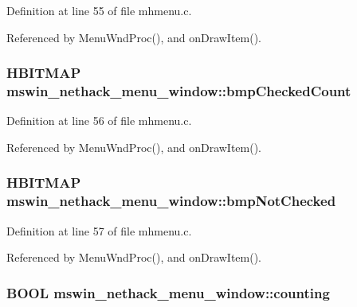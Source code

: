 Definition at line 55 of file mhmenu.\+c.



Referenced by Menu\+Wnd\+Proc(), and on\+Draw\+Item().

\hypertarget{structmswin__nethack__menu__window_a489e74d381e225e45bdcd709b76a9c4a}{
\subsubsection[{bmp\+Checked\+Count}]{\setlength{\rightskip}{0pt plus 5cm}H\+B\+I\+T\+M\+A\+P mswin\+\_\+nethack\+\_\+menu\+\_\+window\+::bmp\+Checked\+Count}}\label{structmswin__nethack__menu__window_a489e74d381e225e45bdcd709b76a9c4a}


Definition at line 56 of file mhmenu.\+c.



Referenced by Menu\+Wnd\+Proc(), and on\+Draw\+Item().

\hypertarget{structmswin__nethack__menu__window_a815f5ad41abbfa599ea0b35ddb7e2742}{
\subsubsection[{bmp\+Not\+Checked}]{\setlength{\rightskip}{0pt plus 5cm}H\+B\+I\+T\+M\+A\+P mswin\+\_\+nethack\+\_\+menu\+\_\+window\+::bmp\+Not\+Checked}}\label{structmswin__nethack__menu__window_a815f5ad41abbfa599ea0b35ddb7e2742}


Definition at line 57 of file mhmenu.\+c.



Referenced by Menu\+Wnd\+Proc(), and on\+Draw\+Item().

\hypertarget{structmswin__nethack__menu__window_aa60c482ee621ddd3472cfe6ea4c63bf5}{
\subsubsection[{counting}]{\setlength{\rightskip}{0pt plus 5cm}B\+O\+O\+L mswin\+\_\+nethack\+\_\+menu\+\_\+window\+::counting}}\label{structmswin__nethack__menu__window_aa60c482ee621ddd3472cfe6ea4c63bf5}


